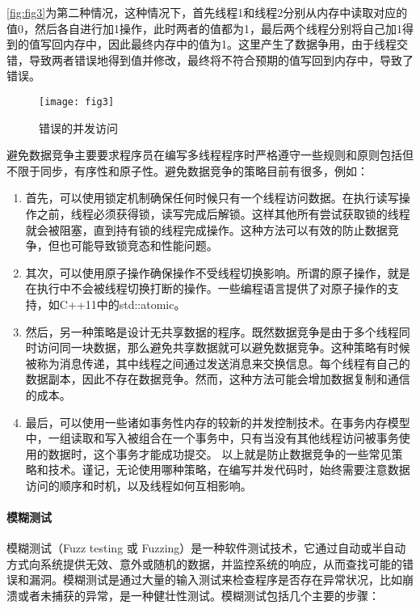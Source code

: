 \autoref{fig:fig3}为第二种情况，这种情况下，首先线程1和线程2分别从内存中读取对应的值0，然后各自进行加1操作，此时两者的值都为1，最后两个线程分别将自己加1得到的值写回内存中，因此最终内存中的值为1。这里产生了数据争用，由于线程交错，导致两者错误地得到值并修改，最终将不符合预期的值写回到内存中，导致了错误。

\begin{figure}[ht]
    \centering
    \texttt{[image: fig3]}
    \caption{\label{fig:fig3}错误的并发访问}
\end{figure}

避免数据竞争主要要求程序员在编写多线程程序时严格遵守一些规则和原则包括但不限于同步，有序性和原子性。避免数据竞争的策略目前有很多，例如：

\begin{enumerate}
\item 首先，可以使用锁定机制确保任何时候只有一个线程访问数据。在执行读写操作之前，线程必须获得锁，读写完成后解锁。这样其他所有尝试获取锁的线程就会被阻塞，直到持有锁的线程完成操作。这种方法可以有效的防止数据竞争，但也可能导致锁竞态和性能问题。
\item 其次，可以使用原子操作确保操作不受线程切换影响。所谓的原子操作，就是在执行中不会被线程切换打断的操作。一些编程语言提供了对原子操作的支持，如C++11中的std::atomic。
\item 然后，另一种策略是设计无共享数据的程序。既然数据竞争是由于多个线程同时访问同一块数据，那么避免共享数据就可以避免数据竞争。这种策略有时候被称为消息传递，其中线程之间通过发送消息来交换信息。每个线程有自己的数据副本，因此不存在数据竞争。然而，这种方法可能会增加数据复制和通信的成本。
\item 最后，可以使用一些诸如事务性内存的较新的并发控制技术。在事务内存模型中，一组读取和写入被组合在一个事务中，只有当没有其他线程访问被事务使用的数据时，这个事务才能成功提交。
以上就是防止数据竞争的一些常见策略和技术。谨记，无论使用哪种策略，在编写并发代码时，始终需要注意数据访问的顺序和时机，以及线程如何互相影响。
\end{enumerate}

\paragraph{模糊测试}模糊测试（Fuzz testing 或 Fuzzing）是一种软件测试技术，它通过自动或半自动方式向系统提供无效、意外或随机的数据，并监控系统的响应，从而查找可能的错误和漏洞。模糊测试是通过大量的输入测试来检查程序是否存在异常状况，比如崩溃或者未捕获的异常，是一种健壮性测试。模糊测试包括几个主要的步骤：


